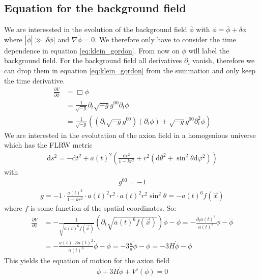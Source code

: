 \documentclass[a4paper]{article}
\begin{document}
\subsection{Equation for the background field}
We are interessted in the evolution of the background field $\bar{\phi}$ with $\phi = \bar{\phi} + \delta \phi$ where
$|\bar{\phi}| \gg |\delta \phi|$ and $\nabla \bar{\phi} = 0$. We therefore only have to consider the time dependence in equation \ref{eq:klein_gordon}. From now on $\phi$ will label the background field.
For the background field all derivatives $\partial_i$ vanish, therefore we can drop them in equation \ref{eq:klein_gordon} from the summation and only keep the time derivative.
\begin{align*}
    \frac{\partial V}{\partial \phi} &= \Box \phi \\
                                     &= \frac{1}{\sqrt{-g}} \partial_t \sqrt{-g} g^{00} \partial_t \phi \\
                                     &= \frac{1}{\sqrt{-g}} \left( (\partial_t \sqrt{-g} g^{00}) (\partial_t \phi) + \sqrt{-g} g^{00} \partial^2_t \phi \right)
\end{align*}
We are interested in the evolutation of the axion field in a homogenious universe which has the FLRW metric \cite[Chap. 1.3.2., Page 20]{CosmologyBookMukhanov}
\begin{align}
    \label{eq:flrw}
    \mathrm{d}s^2 = -\mathrm{d}t^2 + a(t)^2 \left(\frac{\mathrm{d}r^2}{1 - kr^2} + r^2(\mathrm{d}\theta^2 + \sin^2 \theta \mathrm{d} \varphi^2)\right)
\end{align}
with
\begin{align*}
    g^{00} = -1
\end{align*}
\begin{align*}
    g = -1 \cdot \frac{a(t)^2}{1 - kr^2} \cdot a(t)^2 r^2 \cdot a(t)^2 r^2 \sin^2 \theta
      = - a(t)^6 f(\vec{x})
\end{align*}
where $f$ is some function of the spatial coordinates.
So:
\begin{align*}
    \frac{\partial V}{\partial \phi} &= - \frac{1}{\sqrt{a(t)^6 f(\vec{x})}} (\partial_t \sqrt{ a(t)^6 f(\vec{x}) }) \dot{\phi} - \ddot{\phi}
                                     = - \frac{\partial_t a(t)^3}{a(t)^3} \dot{\phi} - \ddot{\phi} \\
                                     &= - \frac{\dot{a}(t) \cdot 3 a(t)^2}{a(t)^3} \dot{\phi} - \ddot{\phi}
                                     = - 3 \frac{\dot{a}}{a} \dot{\phi} - \ddot{\phi}
                                     = - 3H \dot{\phi} - \ddot{\phi}
\end{align*}
This yields the equation of motion for the axion field \cite[Chap 4.2, Page 25]{MarshAxionCosmo}
\begin{align}
    \label{eq:eom}
    \ddot{\phi} + 3 H \dot{\phi} + V'(\phi) = 0
\end{align}
\end{document}
